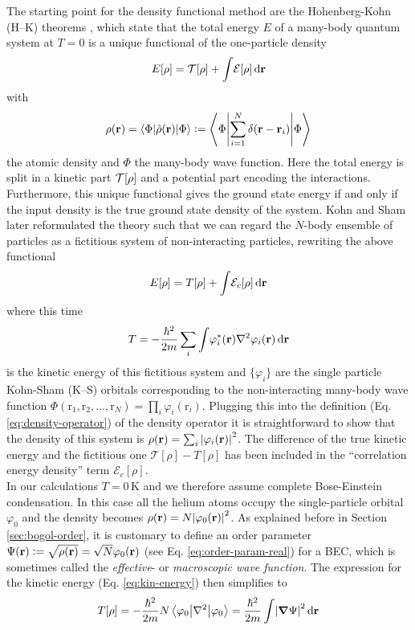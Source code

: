 \documentclass[12pt,a4paper]{book}
\renewcommand{\vec}[1]{\bm{\mathrm{#1}}}
\newcommand{\unit}[1]{\,\mathrm{#1}}
\newcommand{\diff}[1]{\,\mathrm{d}{\vec{#1}}}
\begin{document}
		The starting point for the density functional method are the Hohenberg-Kohn (H--K) theorems \cite{Hoh64}, which state that the total energy $E$ of a many-body quantum system at $T=0$ is a unique functional of the one-particle density
		\begin{align}
			E[\rho] = {\cal T}[\rho] +\int\!{\cal E}[\rho]\diff{r} \label{eq1}
		\end{align}
		with
		\begin{align}\label{eq:density-operator}
			\rho({\mathbf r})= \ev**{\hat\rho(\vec{r})}{\Phi} \vcentcolon= \ev**{\sum _{i=1}^{N}\delta({\mathbf r}-{\mathbf r}_i)}{\Phi}
		\end{align}
		the atomic density and $\Phi$ the many-body wave function. Here the total energy is split in a kinetic part ${\cal T}[\rho]$ and a potential part encoding the interactions. Furthermore, this unique functional gives the ground state energy if and only if the input density is the true ground state density of the system. Kohn and Sham later reformulated the theory such that we can regard the $N$-body ensemble of particles as a fictitious system of non-interacting particles, rewriting the above functional 
		\begin{equation}
			E[\rho] = T[\rho] + \int\!{\cal E}_c[\rho]\diff{r} \label{eq:ks-tot-energy}
		\end{equation}
		where this time
		\begin{equation}
			T= -\frac{\hbar^2}{2m} \sum_i \int\! \varphi_i^*({\mathbf r})\laplacian \varphi_i({\mathbf r})\diff{r} \label{eq:kin-energy}
		\end{equation}
		is the kinetic energy of this fictitious system and $\{\varphi_i\}$ are the single particle Kohn-Sham (K--S) orbitals corresponding to the non-interacting many-body wave function $\Phi(\vec{r}_1,\vec{r}_2,\ldots,\vec{r}_N)=\prod_i\varphi_i(\vec{r}_i)$. Plugging this into the definition (Eq. \ref{eq:density-operator}) of the density operator it is straightforward to show that the density of this system is $\rho(\vec{r})=\sum_i\absolutevalue{\varphi_i(\vec{r})}^2$. The difference of the true kinetic energy and the fictitious one $\mathcal{T}[\rho]-T[\rho]$ has been included in the ``correlation energy density'' term $\mathcal{E}_c[\rho]$.\\
		
		In our calculations $T=0\unit{K}$ and we therefore assume complete Bose-Einstein condensation. In this case all the helium atoms occupy the single-particle orbital $\varphi_0$ and the density becomes $\rho(\vec{r})=N\absolutevalue{\varphi_0(\vec{r})}^2$. As explained before in Section \ref{sec:bogol-order}, it is customary to define an order parameter $\Psi(\vec{r})\vcentcolon=\sqrt{\rho(\vec{r})}=\sqrt{N}\varphi_0(\vec{r})$ (see Eq. \ref{eq:order-param-real}) for a BEC, which is sometimes called the \emph{effective}- or \emph{macroscopic wave function}. The expression for the kinetic energy (Eq. \ref{eq:kin-energy}) then simplifies to
		\begin{align}
			T[\rho] =
			-\frac{\hbar^2}{2m} N \ev**{\laplacian}{\varphi_0} = \frac{\hbar^2}{2m} \int\! \abs{\grad{\Psi}}^2\diff{r} \label{eq5}
		\end{align}
		
\end{document}

